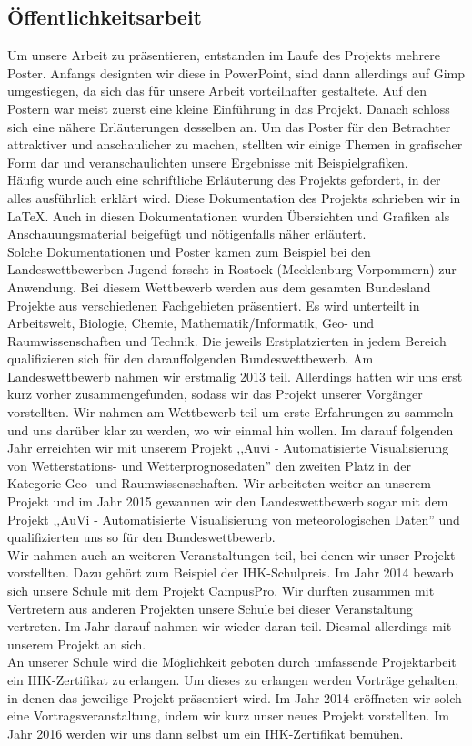 \documentclass[a4paper,oneside,12pt,titlepage]{article}
\newcommand{\jf}{Jugend forscht }
\begin{document}
\subsection{Öffentlichkeitsarbeit} %
Um unsere Arbeit zu präsentieren, entstanden im Laufe des Projekts mehrere Poster. Anfangs designten wir diese in PowerPoint, sind dann allerdings auf Gimp umgestiegen, da sich das für unsere Arbeit vorteilhafter gestaltete. Auf den Postern war meist zuerst eine kleine Einführung in das Projekt. Danach schloss sich eine nähere Erläuterungen desselben an. Um das Poster für den Betrachter attraktiver und anschaulicher zu machen, stellten wir einige Themen in grafischer Form dar und veranschaulichten unsere Ergebnisse mit Beispielgrafiken. \\
Häufig wurde auch eine schriftliche Erläuterung des Projekts gefordert, in der alles ausführlich erklärt wird. Diese Dokumentation des Projekts schrieben wir in \LaTeX . Auch in diesen Dokumentationen wurden Übersichten und Grafiken als Anschauungsmaterial beigefügt und nötigenfalls näher erläutert.\\
Solche Dokumentationen und Poster kamen zum Beispiel bei den Landeswettbewerben \jf in Rostock (Mecklenburg Vorpommern) zur Anwendung. Bei diesem Wettbewerb werden aus dem gesamten Bundesland Projekte aus verschiedenen Fachgebieten präsentiert. Es wird unterteilt in Arbeitswelt, Biologie, Chemie, Mathematik/Informatik, Geo- und Raumwissenschaften und Technik. Die jeweils Erstplatzierten in jedem Bereich qualifizieren sich für den darauffolgenden Bundeswettbewerb. Am Landeswettbewerb nahmen wir erstmalig 2013 teil. Allerdings hatten wir uns erst kurz vorher zusammengefunden, sodass wir das Projekt unserer Vorgänger vorstellten. Wir nahmen am Wettbewerb teil um erste Erfahrungen zu sammeln und uns darüber klar zu werden, wo wir einmal hin wollen. Im darauf folgenden Jahr erreichten wir mit unserem Projekt ,,Auvi - Automatisierte Visualisierung von Wetterstations- und Wetterprognosedaten'' den zweiten Platz in der Kategorie Geo- und Raumwissenschaften. Wir arbeiteten weiter an unserem Projekt und im Jahr 2015 gewannen wir den Landeswettbewerb sogar mit dem Projekt ,,AuVi - Automatisierte Visualisierung von meteorologischen Daten'' und qualifizierten uns so für den Bundeswettbewerb.\\
Wir nahmen auch an weiteren Veranstaltungen teil, bei denen wir unser Projekt vorstellten. Dazu gehört zum Beispiel der IHK-Schulpreis. Im Jahr 2014 bewarb sich unsere Schule mit dem Projekt CampusPro. Wir durften zusammen mit Vertretern aus anderen Projekten unsere Schule bei dieser Veranstaltung vertreten. Im Jahr darauf nahmen wir wieder daran teil. Diesmal allerdings mit unserem Projekt an sich.\\
An unserer Schule wird die Möglichkeit geboten durch umfassende Projektarbeit ein IHK-Zertifikat zu erlangen. Um dieses zu erlangen werden Vorträge gehalten, in denen das jeweilige Projekt präsentiert wird. Im Jahr 2014 eröffneten wir solch eine Vortragsveranstaltung, indem wir kurz unser neues Projekt vorstellten. Im Jahr 2016 werden wir uns dann selbst um ein IHK-Zertifikat bemühen.
\end{document}
